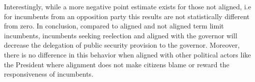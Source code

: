 \documentclass[12pt]{amsart}
\numberwithin{equation}{section}
\theoremstyle{definition}
\theoremstyle{definition}
\theoremstyle{definition}
\begin{document}
Interestingly, while a more negative point estimate exists for those not aligned, i.e for incumbents from an opposition party this results are not statistically different from zero. In conclusion, compared to aligned and not aligned term limit incumbents, incumbents seeking reelection and aligned with the governor will decrease the delegation of public security provision to the governor. Moreover, there is no difference in this behavior when aligned with other political actors like the President where alignment does not make citizens blame or reward the responsiveness of incumbents. %
\end{document}
